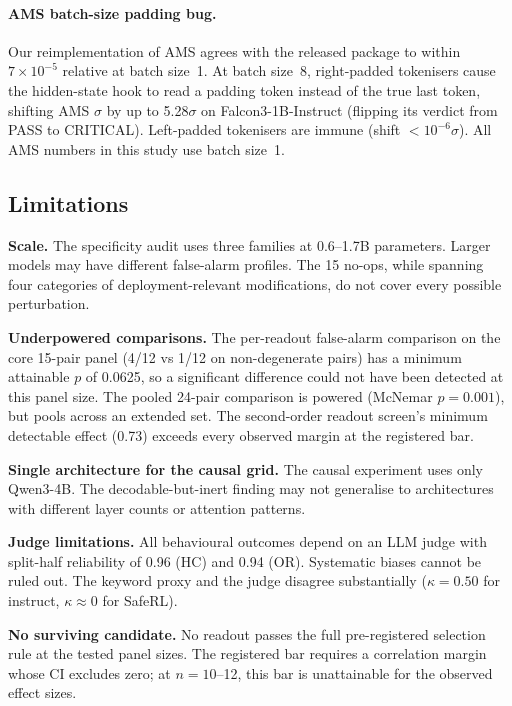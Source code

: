 \documentclass[11pt,letterpaper]{article}
\begin{document}
\paragraph{AMS batch-size padding bug.}
Our reimplementation of AMS agrees with the released package to within $7 \times 10^{-5}$ relative at batch size~1. At batch size~8, right-padded tokenisers cause the hidden-state hook to read a padding token instead of the true last token, shifting AMS $\sigma$ by up to 5.28$\sigma$ on Falcon3-1B-Instruct (flipping its verdict from PASS to CRITICAL). Left-padded tokenisers are immune (shift $< 10^{-6}\sigma$). All AMS numbers in this study use batch size~1.

\subsection{Limitations}
\label{sec:limitations}

\textbf{Scale.} The specificity audit uses three families at 0.6--1.7B parameters. Larger models may have different false-alarm profiles. The 15 no-ops, while spanning four categories of deployment-relevant modifications, do not cover every possible perturbation.

\textbf{Underpowered comparisons.} The per-readout false-alarm comparison on the core 15-pair panel (4/12 vs 1/12 on non-degenerate pairs) has a minimum attainable $p$ of 0.0625, so a significant difference could not have been detected at this panel size. The pooled 24-pair comparison is powered (McNemar $p = 0.001$), but pools across an extended set. The second-order readout screen's minimum detectable effect (0.73) exceeds every observed margin at the registered bar.

\textbf{Single architecture for the causal grid.} The causal experiment uses only Qwen3-4B. The decodable-but-inert finding may not generalise to architectures with different layer counts or attention patterns.

\textbf{Judge limitations.} All behavioural outcomes depend on an LLM judge with split-half reliability of 0.96 (HC) and 0.94 (OR). Systematic biases cannot be ruled out. The keyword proxy and the judge disagree substantially ($\kappa = 0.50$ for instruct, $\kappa \approx 0$ for SafeRL).

\textbf{No surviving candidate.} No readout passes the full pre-registered selection rule at the tested panel sizes. The registered bar requires a correlation margin whose CI excludes zero; at $n = 10$--12, this bar is unattainable for the observed effect sizes.
\end{document}
